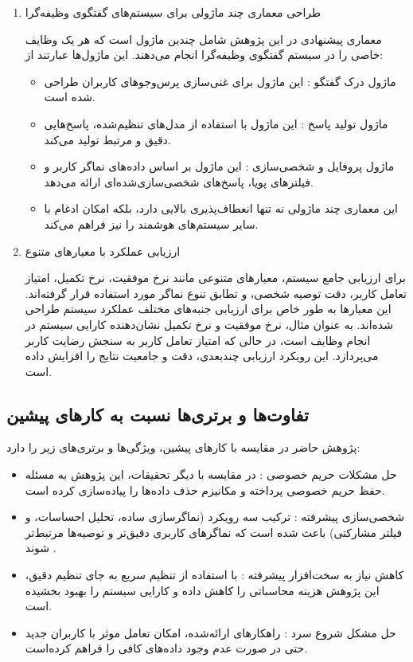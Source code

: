 \begin{enumerate}
\item
طراحی معماری چند ماژولی برای سیستم‌های گفتگوی وظیفه‌گرا

معماری پیشنهادی در این پژوهش شامل چندین ماژول است که هر یک وظایف خاصی را در سیستم گفتگوی وظیفه‌گرا انجام می‌دهند. این ماژول‌ها عبارتند از:
\begin{itemize}
\item
ماژول درک گفتگو : این ماژول برای غنی‌سازی پرس‌وجوهای کاربران طراحی شده است.
\item
ماژول تولید پاسخ : این ماژول با استفاده از مدل‌های تنظیم‌شده، پاسخ‌هایی دقیق و مرتبط تولید می‌کند.
\item
ماژول پروفایل و شخصی‌سازی : این ماژول بر اساس داده‌های نماگر کاربر و فیلترهای پویا، پاسخ‌های شخصی‌سازی‌شده‌ای ارائه می‌دهد.

\item
این معماری چند ماژولی نه تنها انعطاف‌پذیری بالایی دارد، بلکه امکان ادغام با سایر سیستم‌های هوشمند را نیز فراهم می‌کند.
\end{itemize}

\item

ارزیابی عملکرد با معیارهای متنوع

برای ارزیابی جامع سیستم، معیارهای متنوعی مانند نرخ موفقیت، نرخ تکمیل، امتیاز تعامل کاربر، دقت توصیه شخصی، و تطابق تنوع نماگر مورد استفاده قرار گرفته‌اند. این معیارها به طور خاص برای ارزیابی جنبه‌های مختلف عملکرد سیستم طراحی شده‌اند. به عنوان مثال، نرخ موفقیت و نرخ تکمیل نشان‌دهنده کارایی سیستم در انجام وظایف است، در حالی که امتیاز تعامل کاربر به سنجش رضایت کاربر می‌پردازد. این رویکرد ارزیابی چندبعدی، دقت و جامعیت نتایج را افزایش داده است.
\end{enumerate}

\subsection{تفاوت‌ها و برتری‌ها نسبت به کارهای پیشین}
پژوهش حاضر در مقایسه با کارهای پیشین، ویژگی‌ها و برتری‌های زیر را دارد:
\begin{itemize}
\item
حل مشکلات حریم خصوصی : در مقایسه با دیگر تحقیقات، این پژوهش به مسئله حفظ حریم خصوصی پرداخته و مکانیزم حذف داده‌ها را پیاده‌سازی کرده است.
\item
شخصی‌سازی پیشرفته : ترکیب سه رویکرد (نماگر‌سازی ساده، تحلیل احساسات، و فیلتر مشارکتی) باعث شده است که نماگر‌های کاربری دقیق‌تر و توصیه‌ها مرتبط‌تر شوند .
\item
کاهش نیاز به سخت‌افزار پیشرفته : با استفاده از تنظیم سریع به جای تنظیم دقیق، این پژوهش هزینه محاسباتی را کاهش داده و کارایی سیستم را بهبود بخشیده است.
\item
حل مشکل شروع سرد : راهکارهای ارائه‌شده، امکان تعامل موثر با کاربران جدید حتی در صورت عدم وجود داده‌های کافی را فراهم کرده‌است.
\end{itemize}



